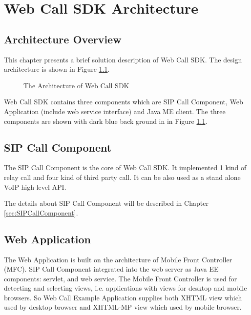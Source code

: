 
\chapter{Web Call SDK Architecture}
\label{sec:WebCallSDKArchitecture}

\section{Architecture Overview}
\label{sec:WebCallSDKArchitecture:ArchitectureOverview}

This chapter presents a brief solution description of Web Call SDK. The design architecture is shown in Figure \ref{fig:ArchitectureOfWebCallSDK}.

\begin{figure}[!hbtp]
\centering
{}
\caption{The Architecture of Web Call SDK}
\label{fig:ArchitectureOfWebCallSDK}
\end{figure}

Web Call SDK contains three components which are SIP Call Component, Web Application (include web service interface) and Java ME client. The three components are shown with dark blue back ground in in Figure \ref{fig:ArchitectureOfWebCallSDK}.

\section{SIP Call Component}

The SIP Call Component is the core of Web Call SDK. It implemented 1 kind of relay call and four kind of third party call. It can be also used as a stand alone VoIP high-level API. 

The details about SIP Call Component will be described in Chapter \ref{sec:SIPCallComponent}.

\section{Web Application}

The Web Application is built on the architecture of Mobile Front Controller (MFC). SIP Call Component integrated into the web server as Java EE components: servlet, and web service. The Mobile Front Controller is used for detecting and selecting views, i.e. applications with views for desktop and mobile browsers. So Web Call Example Application supplies both XHTML view which used by desktop browser and XHTML-MP view which used by mobile browser. 

